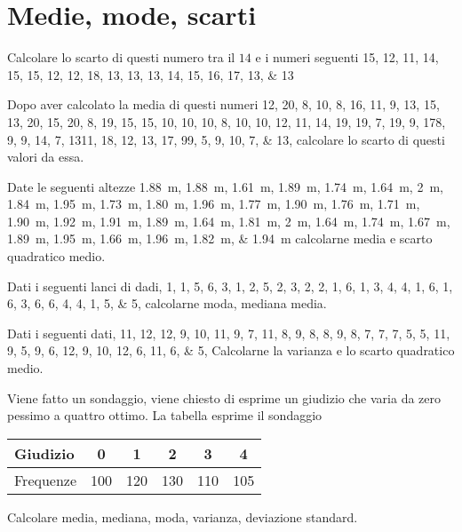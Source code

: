 \section{Medie, mode, scarti}
\begin{esercizio}
	Calcolare lo scarto di questi numero tra il $14$ e i numeri seguenti \numlist{15;12; 11; 14; 15; 15; 12; 12; 18; 13; 13; 13; 14; 15; 16; 17; 13; 13}
\end{esercizio}
\begin{esercizio}
	Dopo aver calcolato la media di questi numeri \numlist{12; 20; 8; 10; 8; 16; 11; 9; 13; 15; 13; 20; 15; 20; 8; 19; 15; 15; 10; 10; 10; 8;
		10; 10; 12; 11; 14; 19; 19; 7; 19; 9; 17 8; 9; 9; 14; 7; 13 11; 18; 12; 13; 17; 9 9; 5;
		9; 10; 7; 13}, calcolare lo scarto di questi valori da essa.
\end{esercizio}
\begin{esercizio}
	 Date le seguenti altezze \SIlist{1.88; 1.88; 1.61; 1.89; 1.74; 1.64; 2; 1.84; 1.95; 1.73; 1.80; 1.96; 1.77; 1.90; 1.76; 1.71; 1.90;
		1.92; 1.91; 1.89; 1.64; 1.81; 2; 1.64; 1.74; 1.67; 1.89; 1.95; 1.66; 1.96; 1.82; 1.94}{\m} calcolarne media e scarto quadratico medio.
\end{esercizio}
\begin{esercizio}
Dati i seguenti lanci di dadi, \numlist{1; 1; 5; 6; 3; 1; 2; 5; 2; 3; 2; 2; 1; 6; 1; 3; 4; 4; 1; 6; 1; 6; 3; 6; 6; 4; 4; 1; 5; 5}, calcolarne moda, mediana media.
\end{esercizio}
\begin{esercizio}
	Dati i seguenti dati, \numlist{11; 12; 12; 9; 10; 11; 9; 7; 11; 8; 9; 8; 8; 9; 8; 7; 7; 7; 5; 5; 11; 9; 5; 9; 6; 12;
		9; 10; 12; 6; 11; 6; 5}, Calcolarne la varianza e lo scarto quadratico medio.
\end{esercizio}
\begin{esercizio}
	
	\item Viene fatto un sondaggio, viene chiesto di esprime un giudizio che varia da zero pessimo a quattro ottimo. La tabella esprime il sondaggio
	\begin{center}
		\begin{tabular}{l*{5} {S[table-format=3.0]}}
			{Giudizio}	&0 &1 &2 &3&4 \\
			\midrule 
			{Frequenze}	& 100 &120 & 130 & 110&105 \\ 
		\end{tabular}
	\end{center} Calcolare media, mediana, moda, varianza, deviazione standard.
\end{esercizio}

